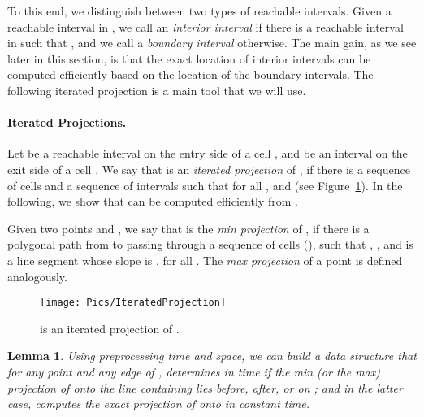 \documentclass[12pt]{dalthesis}
\newtheorem{lemma}[theorem]{Lemma}
\begin{document}
To this end, we distinguish between two types of reachable intervals.
Given a reachable interval  in , 
we call  an \emph{interior interval}
if there is a reachable interval  in  such that ,
and we call  a \emph{boundary interval} otherwise.
The main gain, as we see later in this section, is that the exact location of interior intervals
can be computed efficiently based on the location of the boundary intervals.
The following iterated projection is a main tool that we will use.

\paragraph{Iterated Projections.}
Let  be a reachable interval on the entry side of a cell ,
and  be an interval on the exit side of a cell .
We say that  is an \emph{iterated projection} of , if there is a sequence of cells 
and a sequence of intervals  such that for all ,
 and 
(see Figure~\ref{fig:projection}).
In the following, we show that  can be computed efficiently from .

Given two points  and ,
we say that  is the {\em min projection\/} of , if there is a polygonal path  from  to  passing through 
a sequence of cells  (),
such that , ,
and  is a line segment whose slope is ,
for all .
The {\em max projection\/} of a point  is defined analogously. 


\begin{figure}[t]
	\centering
	\texttt{[image: Pics/IteratedProjection]}  
	\caption{  is an iterated projection of .}
	\label{fig:projection}
\end{figure}

\begin{lemma} \label{lemma:project}
	Using  preprocessing time and space, we can build a data structure 
	that for any point  and any edge  of ,
	determines in  time if the min (or the max) projection of  
	onto the line containing  lies before, after, or on ;
	and in the latter case, computes the exact projection of  onto  in constant time.
\end{lemma}
\end{document}
